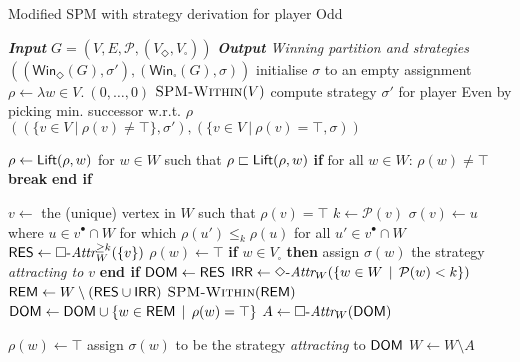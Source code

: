\documentclass{eptcs}
\newcommand{\odd}{\ensuremath{\square}\xspace}
\newcommand{\even}{\ensuremath{\Diamond}\xspace}
\newcommand{\attrsym}{\ensuremath{\textit{Attr}}}
\newcommand{\attrW}[3]{\ensuremath{\mathop{{#1}{\text{-}}\attrsym_{#3}(#2)}}}
\newcommand{\myattrW}[4]{\ensuremath{\mathop{{#2}{\text{-}}\attrsym^{#1}_{#4}(#3)}}}
\newcommand{\winsubodd}[1]{\textsf{Win}_{\odd}(#1)}
\newcommand{\winsubeven}[1]{\textsf{Win}_{\even}(#1)}
\newcommand{\priosym}{\mathcal{P}}
\newcommand{\prio}[1]{\priosym(#1)}
\begin{document}
\begin{algorithm}[h!t]
\caption{Modified SPM with strategy derivation for player Odd}
\label{alg:newspm}
\begin{algorithmic}[1]
\State \emph{\textbf{Input} $G = (V, E, \priosym, (V_\even, V_\odd))$}
\State \emph{\textbf{Output} Winning partition and strategies $((\winsubeven{G},\sigma'),(\winsubodd{G},\sigma))$}
\State initialise $\sigma$ to an empty assignment
\State $\rho  \gets \lambda w \in V.~(0, \dots, 0)$
\State $\Call{\newspm}{V}$
\State compute strategy $\sigma'$ for player Even by picking min. successor w.r.t. $\rho$
\State \Return $((\{v \in V ~|~ \rho(v) \neq \top\},\sigma'),(\{v \in V ~|~ \rho(v) = \top,\sigma))$

\State



 \label{line:outerwhile}
 \label{line:liftloop_start}
\State $\rho \gets \textsf{Lift}(\rho,w)$ for $w \in W$ such that $\rho \sqsubset \textsf{Lift}(\rho,w)$
\EndWhile \label{line:liftloop_end}
\State \textbf{if} {$\text{for all $w \in W$: } \rho(w) \neq \top$} \textbf{break} \textbf{end if}

\State \label{line:firsttop_v} $v \gets $ the (unique) vertex in $W$ such that $\rho(v) = \top$
\State $k \gets \prio{v}$
\State \label{line:firsttop_strat} $\sigma(v) \gets u$ where $u \in v^\bullet \cap W$ for which $\rho(u') \leq_{k} \rho(u)$ for all $u' \in v^\bullet \cap W$
\State $\res \gets \myattrW{\geq k}{\odd}{\{v\}}{W}$
\State $\rho(w) \gets \top$
\State \textbf{if} $w \in V_{\odd}$ \textbf{then} assign $\sigma(w)$ the strategy \emph{attracting to $v$} \textbf{end if} 
\EndFor \label{line:defsigma_res_end}
\State $\textsf{DOM} \gets \textsf{RES}$
\State \label{line:compute_irr} $\irr \gets \attrW{\even}{\{ w \in W \,\mid\, \prio{w} < k\}}{W}$
  \State \label{line:rem} $\textsf{REM} \gets W \setminus (\textsf{RES} \cup \textsf{IRR})$
  \State \label{line:reccall} $\Call{\newspm}{\rem}$  
  \State $\textsf{DOM} \gets \textsf{DOM} \cup \{ w \in \textsf{REM} \,\mid\, \rho(w) = \top \}$ \label{line:dominion_resolved}
\State $A \gets \attrW{\odd}{\dom}{W}$

  \State $\rho(w) \gets \top$
    \If{$w \in V_{\odd}$} 
    assign $\sigma(w)$ to be the strategy  \emph{attracting} to $\textsf{DOM}$ 
    \EndIf
  \EndFor
\State \label{line:smallerW} $W \gets W \setminus A$
\EndWhile
\EndProcedure
\EndFunction

\end{algorithmic}
\end{algorithm}
\end{document}
